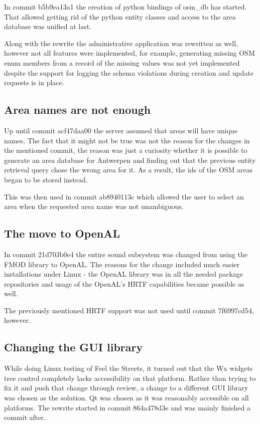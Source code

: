 \documentclass[nolof,digital]{fithesis3}
\begin{document}
In commit b5b9ea13a1 the creation of python bindings of osm\_db has started. That allowed getting rid of the python entity classes and access to the area database was unified at last.

Along with the rewrite the administrative application was rewritten as well, however not all features were implemented, for example, generating missing OSM enum members from a record of the missing values was not yet implemented despite the support for logging the schema violations during creation and update requests is in place.
\subsection{Area names are not enough}
Up until commit acf47daa00 the server assumed that areas will have unique names. The fact that it might not be true was not the reason for the changes in the mentioned commit, the reason was just a curiosity whether it is possible to generate an area database for Antwerpen and finding out that the previous entity retrieval query chose the wrong area for it. As a result, the ids of the OSM areas began to be stored instead.

This was then used in commit ab8940113c which allowed the user to select an area when the requested area name was not unambiguous.
\subsection{The move to OpenAL}
In commit 21d703b0e4 the entire sound subsystem was changed from using the FMOD library \parencite{fmod} to OpenAL. The reasons for the change included much easier installations under Linux - the OpenAL library was in all the needed package repositories and usage of the OpenAL's HRTF capabilities became possible as well.

The previously mentioned HRTF support was not used until commit 7f6997cd54, however.
\subsection{Changing the GUI library}
While doing Linux testing of Feel the Streets, it turned out that the Wx widgets tree control completely lacks accessibility on that platform. Rather than trying to fix it and push that change through review, a change to a different GUI library was chosen as the solution. Qt was chosen as it was reasonably accessible on all platforms. The rewrite started in commit 864a478d3e and was mainly finished a commit after.
\end{document}
